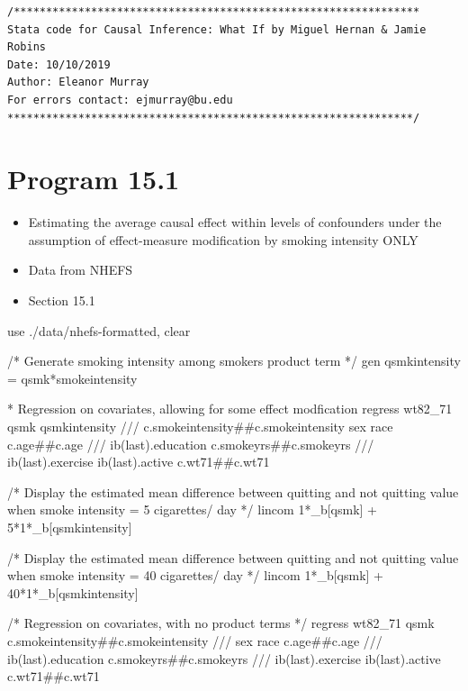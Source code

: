 \documentclass[
  10pt,
  a4paper,
]{book}
\newenvironment{Shaded}{\begin{snugshade}}{\end{snugshade}}
\newcommand{\CommentTok}[1]{\textcolor[rgb]{0.37,0.37,0.37}{#1}}
\newcommand{\FunctionTok}[1]{\textcolor[rgb]{0.28,0.35,0.67}{#1}}
\newcommand{\KeywordTok}[1]{\textcolor[rgb]{0.00,0.46,0.62}{#1}}
\newcommand{\NormalTok}[1]{\textcolor[rgb]{0.00,0.46,0.62}{#1}}
\providecommand{\tightlist}{%
  \setlength{\itemsep}{0pt}\setlength{\parskip}{0pt}}
\begin{document}
\begin{verbatim}
/***************************************************************
Stata code for Causal Inference: What If by Miguel Hernan & Jamie Robins
Date: 10/10/2019
Author: Eleanor Murray 
For errors contact: ejmurray@bu.edu
***************************************************************/
\end{verbatim}

\hypertarget{program-15.1-1}{%
\section{Program 15.1}\label{program-15.1-1}}

\begin{itemize}
\tightlist
\item
  Estimating the average causal effect within levels of confounders under the assumption of effect-measure modification by smoking intensity ONLY
\item
  Data from NHEFS
\item
  Section 15.1
\end{itemize}

\begin{Shaded}
\begin{Highlighting}[]
\KeywordTok{use}\NormalTok{ ./}\KeywordTok{data}\NormalTok{/nhefs{-}formatted, }\KeywordTok{clear}

\CommentTok{/* Generate smoking intensity among smokers product term */}
\KeywordTok{gen}\NormalTok{ qsmkintensity = qsmk*smokeintensity}

\NormalTok{* Regression }\KeywordTok{on}\NormalTok{ covariates, allowing }\KeywordTok{for}\NormalTok{ some effect modfication}
\KeywordTok{regress}\NormalTok{ wt82\_71 qsmk qsmkintensity }\CommentTok{///}
\NormalTok{  c.smokeintensity\#\#c.smokeintensity sex race c.age\#\#c.age }\CommentTok{///}
\NormalTok{  ib(}\FunctionTok{last}\NormalTok{).education c.smokeyrs\#\#c.smokeyrs }\CommentTok{///}
\NormalTok{  ib(}\FunctionTok{last}\NormalTok{).exercise ib(}\FunctionTok{last}\NormalTok{).active c.wt71\#\#c.wt71 }

\CommentTok{/* Display the estimated mean difference between quitting and }
\CommentTok{  not quitting value when smoke intensity = 5 cigarettes/ day */}
\KeywordTok{lincom}\NormalTok{ 1*\_b[qsmk] + 5*1*\_b[qsmkintensity] }

\CommentTok{/* Display the estimated mean difference between quitting and }
\CommentTok{  not quitting value when smoke intensity = 40 cigarettes/ day */}
\KeywordTok{lincom}\NormalTok{ 1*\_b[qsmk] + 40*1*\_b[qsmkintensity]}

\CommentTok{/* Regression on covariates, with no product terms */}
\KeywordTok{regress}\NormalTok{ wt82\_71 qsmk c.smokeintensity\#\#c.smokeintensity }\CommentTok{///}
\NormalTok{  sex race c.age\#\#c.age }\CommentTok{///}
\NormalTok{  ib(}\FunctionTok{last}\NormalTok{).education c.smokeyrs\#\#c.smokeyrs }\CommentTok{///}
\NormalTok{  ib(}\FunctionTok{last}\NormalTok{).exercise ib(}\FunctionTok{last}\NormalTok{).active c.wt71\#\#c.wt71 }
\end{Highlighting}
\end{Shaded}
\end{document}
